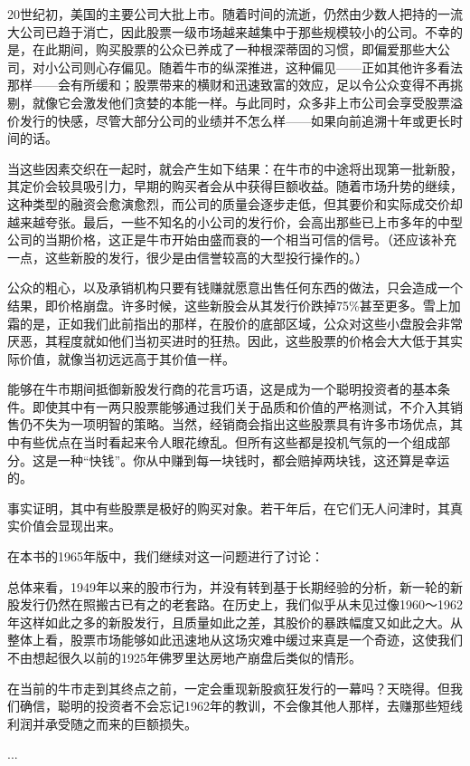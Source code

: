 \documentclass[12pt,oneside]{book}
\begin{document}
20世纪初，美国的主要公司大批上市。随着时间的流逝，仍然由少数人把持的一流大公司已趋于消亡，因此股票一级市场越来越集中于那些规模较小的公司。不幸的是，在此期间，购买股票的公众已养成了一种根深蒂固的习惯，即偏爱那些大公司，对小公司则心存偏见。随着牛市的纵深推进，这种偏见——正如其他许多看法那样——会有所缓和；股票带来的横财和迅速致富的效应，足以令公众变得不再挑剔，就像它会激发他们贪婪的本能一样。与此同时，众多非上市公司会享受股票溢价发行的快感，尽管大部分公司的业绩并不怎么样——如果向前追溯十年或更长时间的话。

当这些因素交织在一起时，就会产生如下结果：在牛市的中途将出现第一批新股，其定价会较具吸引力，早期的购买者会从中获得巨额收益。随着市场升势的继续，这种类型的融资会愈演愈烈，而公司的质量会逐步走低，但其要价和实际成交价却越来越夸张。最后，一些不知名的小公司的发行价，会高出那些已上市多年的中型公司的当期价格，这正是牛市开始由盛而衰的一个相当可信的信号。（还应该补充一点，这些新股的发行，很少是由信誉较高的大型投行操作的。）

公众的粗心，以及承销机构只要有钱赚就愿意出售任何东西的做法，只会造成一个结果，即价格崩盘。许多时候，这些新股会从其发行价跌掉75\%甚至更多。雪上加霜的是，正如我们此前指出的那样，在股价的底部区域，公众对这些小盘股会非常厌恶，其程度就如他们当初买进时的狂热。因此，这些股票的价格会大大低于其实际价值，就像当初远远高于其价值一样。

能够在牛市期间抵御新股发行商的花言巧语，这是成为一个聪明投资者的基本条件。即使其中有一两只股票能够通过我们关于品质和价值的严格测试，不介入其销售仍不失为一项明智的策略。当然，经销商会指出这些股票具有许多市场优点，其中有些优点在当时看起来令人眼花缭乱。但所有这些都是投机气氛的一个组成部分。这是一种“快钱”。你从中赚到每一块钱时，都会赔掉两块钱，这还算是幸运的。

事实证明，其中有些股票是极好的购买对象。若干年后，在它们无人问津时，其真实价值会显现出来。

在本书的1965年版中，我们继续对这一问题进行了讨论：

总体来看，1949年以来的股市行为，并没有转到基于长期经验的分析，新一轮的新股发行仍然在照搬古已有之的老套路。在历史上，我们似乎从未见过像1960～1962年这样如此之多的新股发行，且质量如此之差，其股价的暴跌幅度又如此之大。从整体上看，股票市场能够如此迅速地从这场灾难中缓过来真是一个奇迹，这使我们不由想起很久以前的1925年佛罗里达房地产崩盘后类似的情形。

在当前的牛市走到其终点之前，一定会重现新股疯狂发行的一幕吗？天晓得。但我们确信，聪明的投资者不会忘记1962年的教训，不会像其他人那样，去赚那些短线利润并承受随之而来的巨额损失。

...
\end{document}
